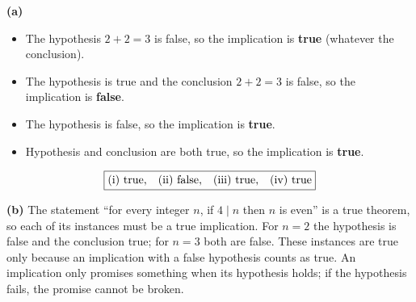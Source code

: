\textbf{(a)}
\begin{itemize}
\item[(i)] The hypothesis $2+2=3$ is false, so the implication is \textbf{true} (whatever the conclusion).
\item[(ii)] The hypothesis is true and the conclusion $2+2=3$ is false, so the implication is \textbf{false}.
\item[(iii)] The hypothesis is false, so the implication is \textbf{true}.
\item[(iv)] Hypothesis and conclusion are both true, so the implication is \textbf{true}.
\end{itemize}
\[\boxed{\text{(i) true,\quad(ii) false,\quad(iii) true,\quad(iv) true}}\]

\textbf{(b)} The statement ``for every integer $n$, if $4\mid n$ then $n$ is even'' is a true theorem, so each of its instances must be a true implication. For $n=2$ the hypothesis is false and the conclusion true; for $n=3$ both are false. These instances are true only because an implication with a false hypothesis counts as true. An implication only promises something when its hypothesis holds; if the hypothesis fails, the promise cannot be broken.
